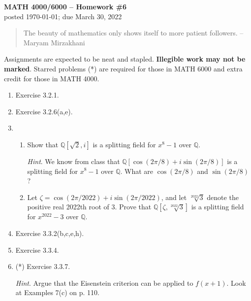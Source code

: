 \documentclass[11pt]{article}
\def\Q{\mathbb{Q}}
\theoremstyle{plain}
\theoremstyle{remark}
\begin{document}
\thispagestyle{empty} \begin{center} {\textbf{MATH 4000/6000 --
Homework \#6}\\ posted \today; due March 30, 2022}
\end{center}

\begin{quote} {\scriptsize The beauty of mathematics only shows itself to more patient followers. -- Maryam Mirzakhani}
\end{quote}

\noindent Assignments are expected to be neat and stapled. \textbf{Illegible work may not be marked}. Starred problems (*) are required for those in MATH 6000 and extra credit for those in MATH 4000.

\vskip 0.1in
\begin{enumerate}

\item Exercise 3.2.1.

\item Exercise 3.2.6(a,e).

\item 
\begin{enumerate}
\item Show that $\Q[\sqrt{2},i]$ is a splitting field for $x^8-1$ over $\Q$. 

{\scriptsize \emph{Hint}. We know from class that $\Q[\cos(2\pi/8) + i\sin(2\pi/8)]$ is a splitting field for $x^8-1$ over $\Q$. What are $\cos(2\pi/8)$ and $\sin(2\pi/8)$?}
\item Let $\zeta = \cos(2\pi/2022) + i \sin(2\pi/2022)$, and let $\sqrt[2022]{3}$ denote the positive real 2022th root of $3$. Prove that $\Q[\zeta,\sqrt[2022]{3}]$ is a splitting field for $x^{2022}-3$ over $\Q$.
\end{enumerate}

\item Exercise 3.3.2(b,c,e,h).

\item Exercise 3.3.4.

\item (*) Exercise 3.3.7.

{\scriptsize \emph{Hint}. Argue that the Eisenstein criterion can be applied to $f(x+1)$. Look at Examples 7(c) on p. 110.}


\end{enumerate}
\end{document}
